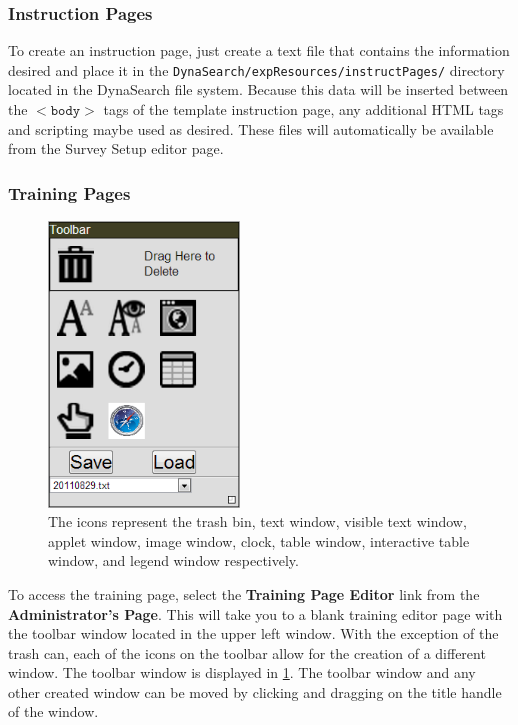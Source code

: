 \documentclass[article]{ij4uq}              %
\begin{document}
\subsubsection{Instruction Pages}
To create an instruction page, just create a text file that contains the information desired and place it in the \newline \texttt{DynaSearch/expResources/instructPages/} directory located in the DynaSearch file system. Because this data will be inserted between the $<\texttt{body}>$ tags of the template instruction page, any additional HTML tags and scripting maybe used as desired. These files will automatically be available from the Survey Setup editor page. 

\subsubsection{Training Pages}

\begin{figure}[h!]
 \centering
 \includegraphics[width=2.0in]{figures/toolbar.png}
 \caption{The icons represent the trash bin, text window, visible text window, applet window, image window, clock, table window, interactive table window, and legend window respectively.}
 \label{fig:tool}
\end{figure}
\FloatBarrier

To access the training page, select the \textbf{Training Page Editor} link from the \textbf{Administrator's Page}. This will take you to a blank training editor page with the toolbar window located in the upper left window. With the exception of the trash can, each of the icons on the toolbar allow for the creation of a different window. The toolbar window is displayed in \ref{fig:tool}. The toolbar window and any other created window can be moved by clicking and dragging on the title handle of the window.
\end{document}

